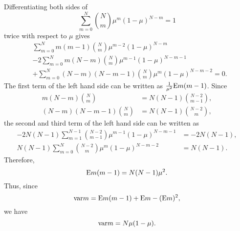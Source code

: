 Differentiating both sides of 
%
\begin{equation}
\sum_{m = 0}^{N} {N \choose m} \mu ^ m (1 - \mu) ^ {N - m}  = 1
\end{equation}
%
twice with respect to $\mu$ gives
%
\begin{equation}
\begin{aligned}
&\sum_{m = 0}^{N} m (m - 1) {N \choose m} \mu ^ {m - 2} (1 - \mu) ^ {N - m} \\
&- 2 \sum_{m = 0}^{N} m (N - m) {N \choose m} \mu ^ {m - 1} (1 - \mu) ^ {N - m - 1} \\
&+ \sum_{m = 0}^{N} (N - m) (N - m - 1) {N \choose m} \mu ^ m (1 - \mu) ^ {N - m - 2} = 0.
\end{aligned}
\end{equation}
%
The first term of the left hand side can be written as $\frac{1}{\mu ^ 2} {\rm E} m (m - 1)$.
Since
%
\begin{equation}
\begin{aligned}
m (N - m) {N \choose m} &= N (N - 1) {N - 2 \choose m - 1}, \\
(N - m) (N - m - 1) {N \choose m} &= N (N - 1) {N - 2 \choose m},
\end{aligned}
\end{equation}
%
the second and third term of the left hand side can be written as
%
\begin{equation}
\begin{aligned}
- 2 N (N - 1) \sum_{m = 1}^{N - 1} {N - 2 \choose m - 1} \mu ^ {m - 1} (1 - \mu) ^ {N - m - 1} &= - 2 N (N - 1), \\
N (N - 1) \sum_{m = 0}^{N} {N - 2 \choose m} \mu ^ m (1 - \mu) ^ {N - m - 2} &= N (N - 1).
\end{aligned}
\end{equation}
%
Therefore,
%
\begin{equation}
{\rm E} m (m - 1) = N (N - 1) \mu ^ 2.
\end{equation}
%
Thus, since 
%
\begin{equation}
{\rm var} m = {\rm E} m (m - 1) + {\rm E} m - ( {\rm E} m ) ^ 2,
\end{equation}
%
we have
%
\begin{equation}
{\rm var} m = N \mu ( 1 - \mu).
\end{equation}
%


